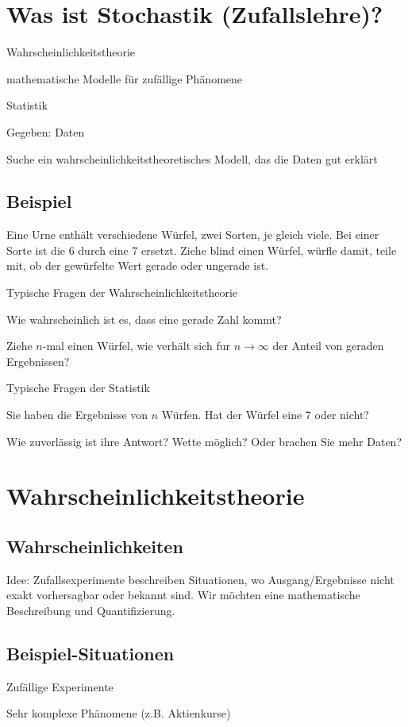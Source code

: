 \section{Was ist Stochastik (Zufallslehre)?}
\enumstart
	\item Wahrscheinlichkeitstheorie
	\enumstart
		\item mathematische Modelle für zufällige Phänomene
	\enumend
	\item Statistik
	\enumstart
		\item Gegeben: Daten
		\item Suche ein wahrscheinlichkeitstheoretisches Modell, das die Daten gut erklärt
	\enumend
\enumend

\subsection{Beispiel}
\enumstart
	\item Eine Urne enthält verschiedene Würfel, zwei Sorten, je gleich viele. Bei einer Sorte ist die 6 durch eine 7 ersetzt. Ziehe blind einen Würfel, würfle damit, teile mit, ob der gewürfelte Wert gerade oder ungerade ist.
	\item Typische Fragen der Wahrscheinlichkeitstheorie
	\enumstart
		\item Wie wahrscheinlich ist es, dass eine gerade Zahl kommt?
		\item Ziehe $n$-mal einen Würfel, wie verhält sich fur $n \rightarrow \infty$ der Anteil von geraden Ergebnissen?
	\enumend
	\item Typische Fragen der Statistik
	\enumstart
		\item Sie haben die Ergebnisse von $n$ Würfen. Hat der Würfel eine 7 oder nicht?
		\item Wie zuverlässig ist ihre Antwort? Wette möglich? Oder brachen Sie mehr Daten?
	\enumend
\enumend

\section{Wahrscheinlichkeitstheorie}
\subsection{Wahrscheinlichkeiten}
Idee: Zufallsexperimente beschreiben Situationen, wo Ausgang/Ergebnisse nicht exakt vorhersagbar oder bekannt sind. Wir möchten eine mathematische Beschreibung und Quantifizierung.

\subsection{Beispiel-Situationen}
\enumstart
	\item Zufällige Experimente
	\item Sehr komplexe Phänomene (z.B. Aktienkurse)
\enumend

